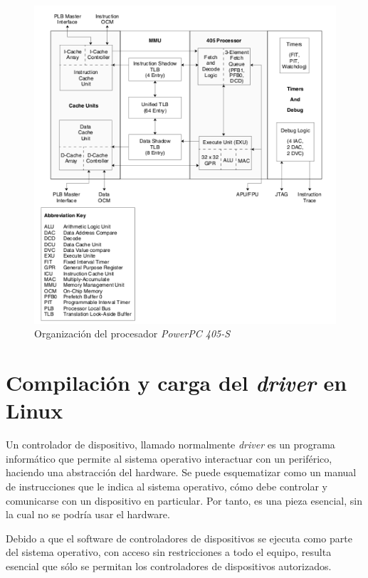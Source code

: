 \begin{figure}[ht]
 \centering
 \includegraphics[scale=.60]{./figuras/arc_ppc405.png}
 \caption{Organización del procesador \emph{PowerPC 405-S}}
 \label{Organización del procesador}
\end{figure}


\section{Compilación y carga del \emph{driver} en Linux}

Un controlador de dispositivo, llamado normalmente \emph{driver} es un programa
informático que permite al sistema operativo interactuar con un periférico,
haciendo una abstracción del hardware. Se puede esquematizar como un manual
de instrucciones que le indica al sistema operativo, cómo debe controlar y
comunicarse con un dispositivo en particular. Por tanto, es una pieza esencial,
sin la cual no se podría usar el hardware.

Debido a que el software de controladores de dispositivos se ejecuta como parte
del sistema operativo, con acceso sin restricciones a todo el equipo, resulta
esencial que sólo se permitan los controladores de dispositivos autorizados.


